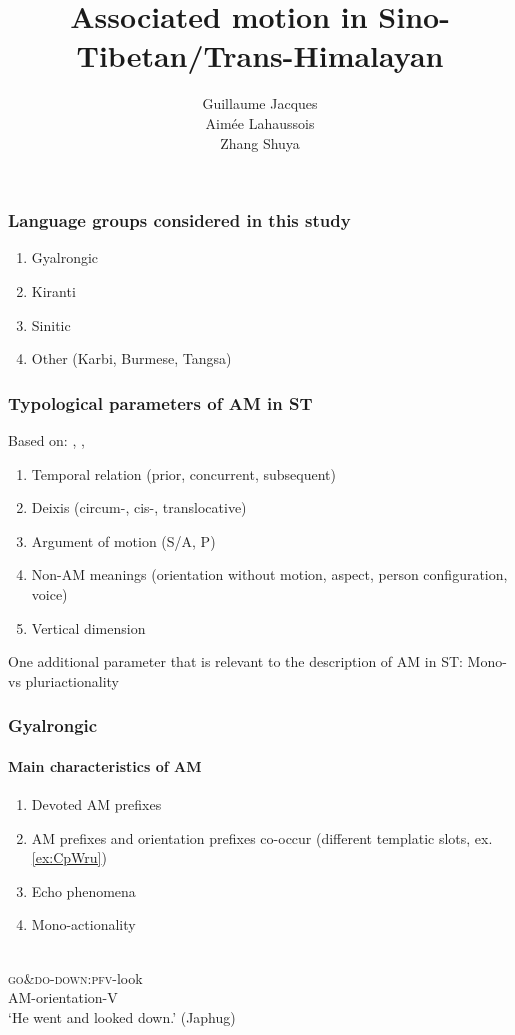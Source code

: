 \documentclass[xcolor=table]{beamer}
\newcommand{\bleu}[1]{{\color{blue}#1}}
\newcommand{\rouge}[1]{{\color{red}#1}}
\newcommand{\ipa}[1]{{\phon\textit{#1}}}
\begin{document}
 \title{Associated motion in Sino-Tibetan/Trans-Himalayan}
 \author{Guillaume Jacques\\ Aimée Lahaussois \\ Zhang Shuya}
 \date{}
 \maketitle
  
 \begin{frame} 
\frametitle{Language groups considered in this study }
\begin{enumerate}
\item Gyalrongic
\item Kiranti
\item Sinitic
\item Other (Karbi, Burmese, Tangsa)
\end{enumerate}
 \end{frame}  
  
\begin{frame} 
\frametitle{Typological parameters of AM in ST}
Based on: \citealt{koch84associated.motion}, \citealt{wilkins91associated.motion}, \citealt{guillaume16am}
\begin{enumerate}
\item Temporal relation (prior, concurrent, subsequent)
\item Deixis (circum-, cis-, translocative)
\item Argument of motion (S/A, P)
\item Non-AM meanings (orientation without motion, aspect, person configuration, voice)
\item Vertical dimension
\end{enumerate}
One additional parameter that is relevant to the description of AM in ST:  \bleu{Mono- vs pluriactionality}
 \end{frame}  

\begin{frame} 
\frametitle{Gyalrongic}
 \framesubtitle{Main characteristics of AM}
\begin{enumerate}
\item Devoted AM prefixes
\item AM prefixes and orientation prefixes co-occur (different templatic slots, ex. \ref{ex:CpWru})
\item Echo phenomena
\item Mono-actionality
\end{enumerate}

\begin{exe}
\ex \label{ex:CpWru}
\glll \ipa{\rouge{ɕ}-\bleu{pɯ}-ru} \\
 \rouge{\textsc{go\&do}}-\bleu{\textsc{down}:\textsc{pfv}}-look \\
\rouge{AM}-\bleu{orientation}-V \\
\glt `He \rouge{went and} looked \bleu{down}.' (Japhug)
\end{exe}

 \end{frame}  
 
\end{document}
